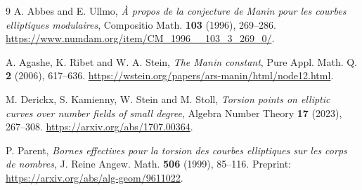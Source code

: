 \documentclass[11pt]{article}
\theoremstyle{remark}\newtheorem{remark}[theorem]{Remark}
\begin{document}
\begin{thebibliography}{9}
A. Abbes and E. Ullmo,
\emph{\`A propos de la conjecture de Manin pour les courbes elliptiques modulaires},
Compositio Math. \textbf{103} (1996), 269--286.
\url{https://www.numdam.org/item/CM_1996__103_3_269_0/}.

A. Agashe, K. Ribet and W. A. Stein,
\emph{The Manin constant},
Pure Appl. Math. Q. \textbf{2} (2006), 617--636.
\url{https://wstein.org/papers/ars-manin/html/node12.html}.

M. Derickx, S. Kamienny, W. Stein and M. Stoll,
\emph{Torsion points on elliptic curves over number fields of small degree},
Algebra Number Theory \textbf{17} (2023), 267--308.
\url{https://arxiv.org/abs/1707.00364}.

P. Parent,
\emph{Bornes effectives pour la torsion des courbes elliptiques sur les corps de nombres},
J. Reine Angew. Math. \textbf{506} (1999), 85--116.
Preprint: \url{https://arxiv.org/abs/alg-geom/9611022}.
\end{thebibliography}
\end{document}
